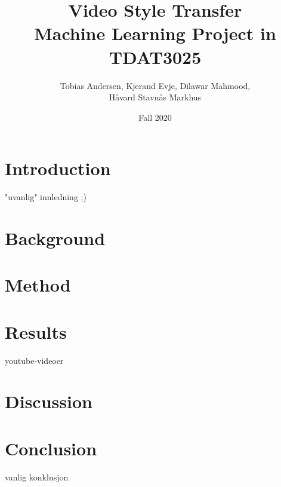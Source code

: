 \documentclass{article}
\title{%
  Video Style Transfer \\
  \large Machine Learning Project in TDAT3025}
\author{Tobias Andersen, Kjerand Evje, Dilawar Mahmood, \\Håvard Stavnås Markhus}
\date{Fall 2020}
\begin{document}

\tableofcontents
\newpage
\section{Introduction}
"uvanlig" innledning ;)
\section{Background}

\section{Method}



\section{Results}
youtube-videoer
\section{Discussion}

\section{Conclusion}
vanlig konklusjon
 

\end{document}
